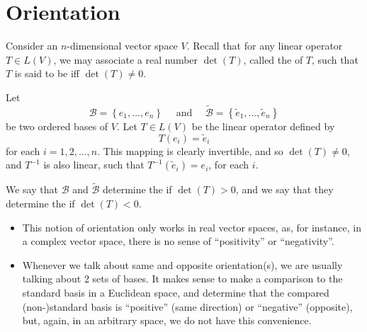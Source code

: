 \documentclass[notoc,notitlepage]{tufte-book}
\begin{document}

\section{Orientation}%
\label{sec:orientation}

Consider an $n$-dimensional vector space $V$. Recall that for any linear operator $T \in L(V)$, we may associate a real number $\det(T)$, called the  of $T$, such that $T$ is said to be  iff $\det(T) \neq 0$.

\begin{defn}\label{defn:same_and_opposite_orientations}
  Let
  \begin{equation*}
    \mathcal{B} = \left\{ e_1, \ldots, e_n \right\} \quad \text{ and } \quad \tilde{\mathcal{B}} = \left\{ \tilde{e}_1, \ldots, \tilde{e}_n \right\}
  \end{equation*}
  be two ordered bases of $V$. Let $T \in L(V)$ be the linear operator defined by
  \begin{equation*}
    T(e_i) = \tilde{e}_i
  \end{equation*}
  for each $i = 1, 2, \ldots, n$. This mapping is clearly invertible, and so $\det(T) \neq 0$, and $T^{-1}$ is also linear, such that $T^{-1} \left( \tilde{e}_i \right) = e_i$, for each $i$.

  We say that $\mathcal{B}$ and $\tilde{\mathcal{B}}$ determine the  if $\det(T) > 0$, and we say that they determine the  if $\det(T) < 0$.
\end{defn}

\begin{note}
  \begin{itemize}
    \item This notion of orientation only works in real vector spaces,
      as, for instance, in a complex vector space,
      there is no sense of ``positivity'' or ``negativity''.
    \item Whenever we talk about same and opposite orientation(s),
      we are usually talking about 2 sets of bases.
      It makes sense to make a comparison to the standard basis in a Euclidean space,
      and determine that the compared (non-)standard basis is
      ``positive'' (same direction) or ``negative'' (opposite),
      but, again, in an arbitrary space, we do not have this convenience.
  \end{itemize}
\end{note}
\end{document}
